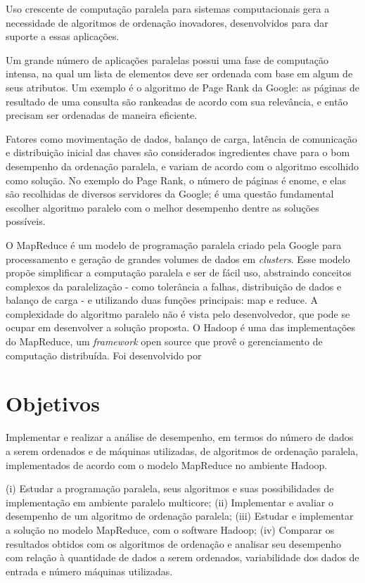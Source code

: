 
Uso crescente de computação paralela para sistemas computacionais gera a necessidade de algoritmos de ordenação inovadores, desenvolvidos para dar suporte a essas aplicações. 

Um grande número de aplicações paralelas possui uma fase de computação intensa, na qual um lista de elementos deve ser ordenada com base em algum de seus atributos. Um exemplo é o algoritmo de Page Rank \cite{PageRank:1999} da Google: as páginas de resultado de uma consulta são rankeadas de acordo com sua relevância, e então precisam ser ordenadas de maneira eficiente.   \cite{Kale:2010} 

Fatores como movimentação de dados, balanço de carga, latência de comunicação e distribuição inicial das chaves são considerados ingredientes chave para o bom desempenho da ordenação paralela, e variam de acordo com o algoritmo escolhido como solução. 
No exemplo do Page Rank, o número de páginas é enome, e elas são recolhidas de diversos servidores da Google; é uma questão fundamental escolher algoritmo paralelo com o melhor desempenho dentre as soluções possíveis.




O MapReduce\cite{Dean:2008}  é um modelo de programação paralela criado pela Google para processamento e geração de grandes volumes de dados em \textit{clusters}. Esse modelo propõe simplificar a computação paralela e ser de fácil uso, abstraindo conceitos complexos da paralelização - como tolerância a falhas, distribuição de dados e balanço de carga - e utilizando duas funções principais: map e reduce. A complexidade do algoritmo paralelo não é vista pelo desenvolvedor, que pode se ocupar em desenvolver a solução proposta. O Hadoop \cite{Hadoop:2010} é uma das implementações do MapReduce, um \textit{framework} open source que provê o gerenciamento de computação distribuída. Foi desenvolvido por 



\section{Objetivos}

Implementar e realizar a análise de desempenho, em termos do número de dados a serem ordenados e de máquinas utilizadas, de algoritmos de ordenação paralela, implementados de acordo com o modelo MapReduce no ambiente Hadoop.

(i) Estudar a programação paralela, seus algoritmos e suas possibilidades de implementação em ambiente paralelo multicore;
(ii) Implementar e avaliar o desempenho de um algoritmo de ordenação paralela;
(iii) Estudar e implementar a solução no modelo MapReduce, com o software Hadoop;
(iv) Comparar os resultados obtidos com os algoritmos de ordenação e analisar seu desempenho com relação à quantidade de dados a serem ordenados, variabilidade dos dados de entrada e número máquinas utilizadas.

